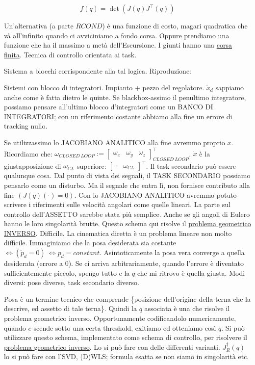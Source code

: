 \[
	f(q) = \det(J(q)J^\top(q))
\]

Un'alternativa (a parte $RCOND$) è una funzione di costo, magari quadratica che và all'infinito quando ci avviciniamo a fondo corsa. Oppure prendiamo una funzione che ha il massimo a metà dell'Escursione. I giunti hanno una \underline{corsa finita}. Tecnica di controllo orientata ai task.

Sistema a blocchi corrispondente alla tal logica. Riproduzione:



Sistemi con blocco di integratori. Impianto + pezzo del regolatore. $\dot{x}_d$ sappiamo anche come è fatta dietro le quinte. Se blackbox-assimo il penultimo integratore, possiamo pensare all'ultimo blocco d'integratori come un BANCO DI INTEGRATORI; con un riferimento costante abbiamo alla fine un errore di tracking nullo.

Se utilizzassimo lo JACOBIANO ANALITICO alla fine avremmo proprio $x$. Ricordiamo che: $\omega_{CLOSED\ LOOP} := \begin{bmatrix}\omega_x&\omega_y&\omega_z\end{bmatrix}^\top_{CLOSED\ LOOP}$. $\dot{x}$ è la giustapposizione di $\omega_{CL}$ superiore: $\begin{bmatrix}\mathord{\cdot}&\omega_{CL}\end{bmatrix}^\top$. Il task secondario può essere qualunque cosa. Dal punto di vista dei segnali, il TASK SECONDARIO possiamo pensarlo come un disturbo. Ma il segnale che entra lì, non fornisce contributo alla fine $(J(q)(\mathord{\cdot})=0)$. Con lo JACOBIANO ANALITICO avremmo potuto scrivere i riferimenti sulle velocità angolari come quelle lineari. La parte sul controllo dell'ASSETTO sarebbe stata più semplice. Anche se gli angoli di Eulero hanno le loro singolarità brutte. Questo schema qui risolve il \underline{problema geometrico INVERSO}. Difficile. La cinematica diretta è un problema lineare non molto difficile. Immaginiamo che la posa desiderata sia costante $\iff (\dot{p}_d=0)\ \iff p_d=constant$. Asintoticamente la posa vera converge a quella desiderata (errore a 0). Se ci arriva arbitrariamente, quando l'errore è diventato sufficientemente piccolo, spengo tutto e la $q$ che mi ritrovo è quella giusta. Modi diversi: pose diverse, task secondario diverso.

Posa è un termine tecnico che comprende \{posizione dell'origine della terna che la descrive, ed assetto di tale terna\}. Quindi la $q$ associata è una che risolve il problema geometrico inverso. Opportunamente codificandolo numericamente, quando $e$ scende sotto una certa threshold, exitiamo ed otteniamo così $q$. Si può utilizzare questo schema, implementato come schema di controllo, per risolvere il \underline{problema geometrico inverso}. Lo si può fare con delle differenti varianti. $J^\dag_R(q)$ lo si può fare con l'SVD, (D)WLS; formula esatta se non siamo in singolarità etc.

